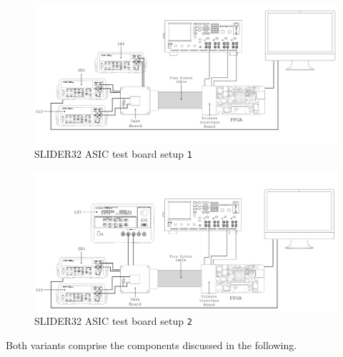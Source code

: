 \begin{figure}[ht]
    \centering
    \includegraphics[width=1\textwidth]{Images/chap1/test_setup_test_board_csavrefgm_auto.png}
    \caption{SLIDER32 ASIC test board setup \texttt{1}}
    \label{figTESTBOARDsetup1}
\end{figure}

\vspace{-1cm}

\begin{figure}[ht]
    \centering
    \includegraphics[width=1\textwidth]{Images/chap1/test_setup_test_board_csavrefgm_530mv.png}
    \caption{SLIDER32 ASIC test board setup \texttt{2}}
    \label{figTESTBOARDsetup2}
\end{figure}

\par
\noindent
Both variants comprise the components discussed in the following.

